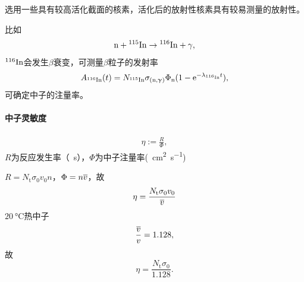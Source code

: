 选用一些具有较高活化截面的核素，活化后的放射性核素具有较易测量的放射性。

比如
\[
	\neutron + \nuclide{115}{In} \to \nuclide{116}{In} + \gamma,
\]
$\nuclide{116}{In}$会发生$\beta$衰变，可测量$\beta$粒子的发射率
\begin{equation}\label{eq:nrd-activation-foil-activity}
	A_{\nuclide{116}{In}}(t) = N_{\nuclide{115}{In}}\sigma_{(\neutron,\upgamma)}\Phi_\neutron(1 - \e^{-\lambda_{\nuclide{116}{In}}t}),
\end{equation}
可确定中子的注量率。
\paragraph{中子灵敏度}
\begin{align}
	\eta := \frac R\Phi,
\end{align}
$R$为反应发生率（\unit{\per\second}），$\Phi$为中子注量率(\unit{\per\centi\metre\squared\per\second})

$R = N_\mathrm t\sigma_0v_0n$，$\Phi = n\overline{v}$，故
\[
	\eta = \frac{N_\mathrm t\sigma_0v_0}{\overline{v}}
\]
$\qty{20}{\degreeCelsius}$热中子
\[
	\frac{\overline{v}}v = 1.128,
\]
故
\[
	\eta = \frac{N_\mathrm t\sigma_0}{1.128}.
\]

